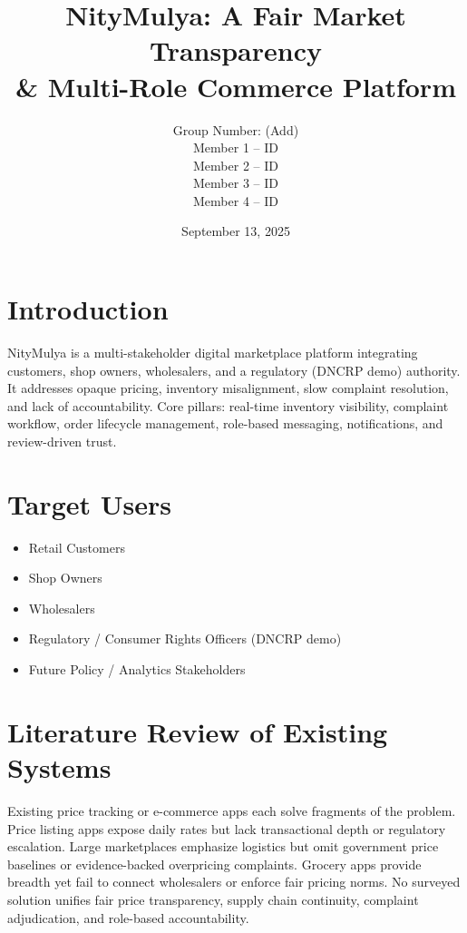 \documentclass[12pt,a4paper]{article}
\title{NityMulya: A Fair Market Transparency \\ & Multi-Role Commerce Platform}
\author{Group Number: (Add) \\ Member 1 -- ID \\ Member 2 -- ID \\ Member 3 -- ID \\ Member 4 -- ID}
\date{September 13, 2025}
\begin{document}
\maketitle
\tableofcontents
\newpage

\section{Introduction}
NityMulya is a multi-stakeholder digital marketplace platform integrating customers, shop owners, wholesalers, and a regulatory (DNCRP demo) authority. It addresses opaque pricing, inventory misalignment, slow complaint resolution, and lack of accountability. Core pillars: real-time inventory visibility, complaint workflow, order lifecycle management, role-based messaging, notifications, and review-driven trust.

\section{Target Users}
\begin{itemize}
  \item Retail Customers
  \item Shop Owners
  \item Wholesalers
  \item Regulatory / Consumer Rights Officers (DNCRP demo)
  \item Future Policy / Analytics Stakeholders
\end{itemize}

\section{Literature Review of Existing Systems}
Existing price tracking or e-commerce apps each solve fragments of the problem. Price listing apps expose daily rates but lack transactional depth or regulatory escalation. Large marketplaces emphasize logistics but omit government price baselines or evidence-backed overpricing complaints. Grocery apps provide breadth yet fail to connect wholesalers or enforce fair pricing norms. No surveyed solution unifies fair price transparency, supply chain continuity, complaint adjudication, and role-based accountability.
\end{document}
